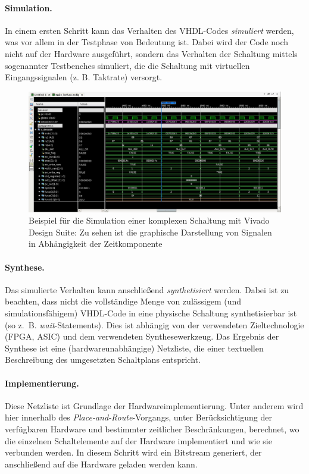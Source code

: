 \paragraph{Simulation.} In einem ersten Schritt kann das Verhalten des
VHDL-Codes \emph{simuliert} werden, was vor allem in der Testphase von Bedeutung ist. Dabei wird der Code noch nicht auf der Hardware ausgeführt, sondern das Verhalten der Schaltung mittels sogenannter Testbenches simuliert, die die Schaltung mit virtuellen Eingangssignalen (z. B. Taktrate) versorgt. \cite[S. 81]{SynthesisFPGA} 
\begin{figure} [ht]
  \centering
  \includegraphics[width=\textwidth]{Figures/simulation}
  \caption{Beispiel für die Simulation einer komplexen Schaltung mit Vivado Design Suite: Zu sehen ist die graphische Darstellung von Signalen in Abhängigkeit der Zeitkomponente}
  \label{fig:simulation}
\end{figure}

\paragraph{Synthese.} Das simulierte Verhalten kann anschließend
\emph{synthetisiert} werden. Dabei ist zu beachten, dass nicht die
vollständige Menge von zulässigem (und simulationsfähigem) VHDL-Code in
eine physische Schaltung synthetisierbar ist (so z.~B.
\emph{wait}-Statements). Dies ist abhängig von der verwendeten Zieltechnologie (FPGA, ASIC) und dem verwendeten Synthesewerkzeug. Das Ergebnis der Synthese ist eine (hardwareunabhängige) Netzliste, die einer textuellen Beschreibung des umgesetzten Schaltplans entspricht.

\paragraph{Implementierung.} Diese Netzliste ist Grundlage der
Hardwareimplementierung. Unter anderem wird hier innerhalb des
\emph{Place-and-Route}-Vorgangs, unter Berücksichtigung der verfügbaren
Hardware und bestimmter zeitlicher Beschränkungen, berechnet, wo die einzelnen Schaltelemente auf der Hardware implementiert und wie sie verbunden werden. In diesem Schritt wird ein Bitstream generiert, der anschließend auf die Hardware geladen werden kann. \cite[S. 21]{SynthesisFPGA}
